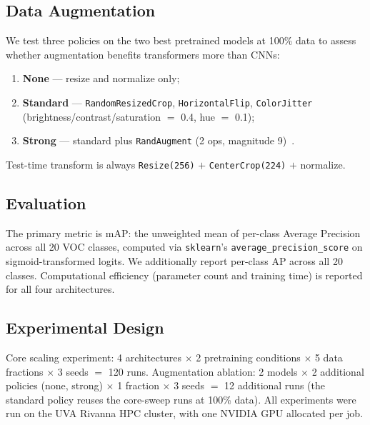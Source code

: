 \documentclass{article}
\begin{document}
\subsection{Data Augmentation}

We test three policies on the two best pretrained models at 100\% data to assess whether augmentation benefits transformers more than CNNs:
\begin{enumerate}
    \item \textbf{None} --- resize and normalize only;
    \item \textbf{Standard} --- \texttt{RandomResizedCrop}, \texttt{HorizontalFlip}, \texttt{ColorJitter} (brightness/contrast/saturation $=$ 0.4, hue $=$ 0.1);
    \item \textbf{Strong} --- standard plus \texttt{RandAugment} (2 ops, magnitude 9)~\citep{cubuk2019randaugment}.
\end{enumerate}
Test-time transform is always \texttt{Resize(256)} $+$ \texttt{CenterCrop(224)} $+$ normalize.

\subsection{Evaluation}

The primary metric is mAP: the unweighted mean of per-class Average Precision across all 20 VOC classes, computed via \texttt{sklearn}'s \texttt{average\_precision\_score} on sigmoid-transformed logits. We additionally report per-class AP across all 20 classes. Computational efficiency (parameter count and training time) is reported for all four architectures.

\subsection{Experimental Design}

Core scaling experiment: 4 architectures $\times$ 2 pretraining conditions $\times$ 5 data fractions $\times$ 3 seeds $=$ 120 runs. Augmentation ablation: 2 models $\times$ 2 additional policies (none, strong) $\times$ 1 fraction $\times$ 3 seeds $=$ 12 additional runs (the standard policy reuses the core-sweep runs at 100\% data). All experiments were run on the UVA Rivanna HPC cluster, with one NVIDIA GPU allocated per job.
\end{document}
